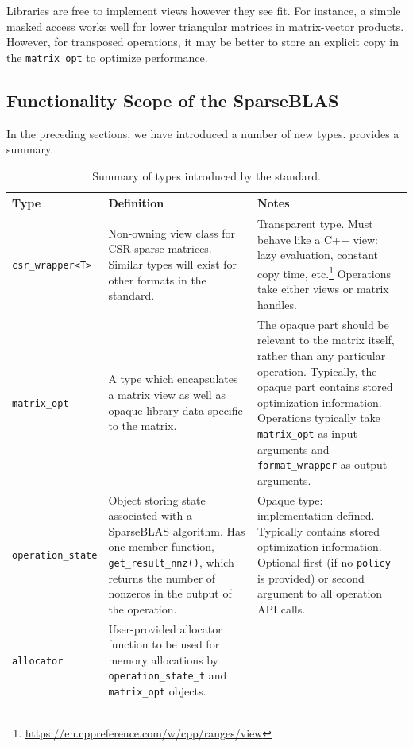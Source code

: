 \documentclass[manuscript,review]{acmart}
\begin{document}
Libraries are free to implement views however they see fit. For instance, a simple masked access works well for lower triangular matrices in matrix-vector products. However, for transposed operations, it may be better to store an explicit copy in the \texttt{matrix\_opt} to optimize performance.



\subsection{Functionality Scope of the SparseBLAS}
\label{sec:functionality}


In the preceding sections, we have introduced a number of new types.  provides a summary.

\begin{table}[htbp]
  \centering
  \caption{Summary of types introduced by the standard.} 
  \label{tab:newtypes}
  \begin{tabularx}{\linewidth}{l X X}
    \toprule
    \textbf{Type} & \textbf{Definition} & \textbf{Notes} \\
    \midrule
    \texttt{csr\_wrapper<T>} 
      & Non-owning view class for CSR sparse matrices. Similar types will exist for other formats in the standard. 
      & Transparent type. Must behave like a C++ view: lazy evaluation, constant copy time, etc.\footnote{\url{https://en.cppreference.com/w/cpp/ranges/view}} Operations take either views or matrix handles. \\
    \addlinespace
    \texttt{matrix\_opt} 
      & A type which encapsulates a matrix view as well as opaque library data specific to the matrix. 
      & The opaque part should be relevant to the matrix itself, rather than any particular operation. Typically, the opaque part contains stored optimization information. Operations typically take \texttt{matrix\_opt} as input arguments and \texttt{format\_wrapper} as output arguments. \\
    \addlinespace
    \texttt{operation\_state} 
      & Object storing state associated with a SparseBLAS algorithm. Has one member function, \texttt{get\_result\_nnz()}, which returns the number of nonzeros in the output of the operation. 
      & Opaque type: implementation defined. Typically contains stored optimization information. Optional first (if no \texttt{policy} is provided) or second argument to all operation API calls. \\
    \addlinespace
    \texttt{allocator} 
      & User-provided allocator function to be used for memory allocations by \texttt{operation\_state\_t} and \texttt{matrix\_opt} objects. 

\end{tabularx}
\end{table}
\end{document}
